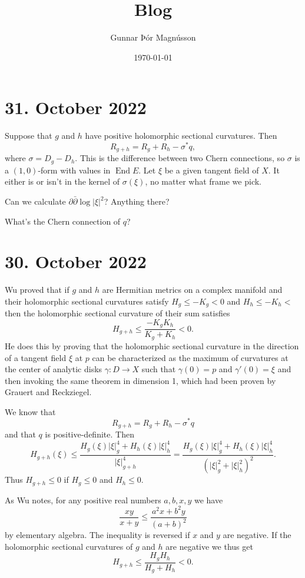 \documentclass[11pt]{article}
\author{Gunnar Þór Magnússon}
\date{\today}
\title{Blog}
\theoremstyle{definition}
\begin{document}
\maketitle


\section{31. October 2022}

Suppose that $g$ and $h$ have positive holomorphic sectional curvatures.
Then
\[
R_{g + h} = R_g + R_h - \sigma^*q,
\]
where $\sigma = D_{g} - D_{h}$.
This is the difference between two Chern connections, so $\sigma$ is a
$(1,0)$-form with values in $\operatorname{End} E$.
Let $\xi$ be a given tangent field of $X$.
It either is or isn't in the kernel of $\sigma(\xi)$, no matter what frame we pick.

Can we calculate $\partial \bar\partial \log |\xi|^2$? Anything there?

What's the Chern connection of $q$?



\section{30. October 2022}

Wu \cite{wu1973remark} proved that if $g$ and $h$ are Hermitian metrics on a
complex manifold and their holomorphic sectional curvatures satisfy $H_g \leq
-K_g < 0$ and $H_h \leq -K_h < $ then the holomorphic sectional curvature of
their sum satisfies
\[
H_{g + h} \leq \frac{-K_g K_h}{K_g + K_h} < 0.
\]
He does this by proving that the holomorphic sectional curvature in the
direction of a tangent field $\xi$ at $p$ can be characterized as the maximum
of curvatures at the center of analytic disks $\gamma : D \to X$ such that
$\gamma(0) = p$ and $\gamma'(0) = \xi$ and then invoking the same theorem in
dimension 1, which had been proven by Grauert and Reckziegel.

We know that
\[
R_{g + h} = R_g + R_h - \sigma^* q
\]
and that $q$ is positive-definite.
Then
\[
H_{g+h}(\xi)
\leq \frac{H_g(\xi) |\xi|^4_g + H_h(\xi) |\xi|^4_h}{|\xi|^4_{g + h}}
= \frac{H_g(\xi) |\xi|^4_g + H_h(\xi) |\xi|^4_h}{(|\xi|^2_{g} + |\xi|^2_h)^2}.
\]
Thus $H_{g + h} \leq 0$ if $H_g \leq 0$ and $H_h \leq 0$.

As Wu notes,
for any positive real numbers $a, b, x, y$ we have
\[
\frac{xy}{x + y} \leq \frac{a^2 x + b^2 y}{(a + b)^2}
\]
by elementary algebra.
The inequality is reversed if $x$ and $y$ are negative.
If the holomorphic sectional curvatures of $g$ and $h$ are negative we thus get
\[
H_{g + h} \leq \frac{H_g H_h}{H_g + H_h} < 0.
\]
\end{document}
